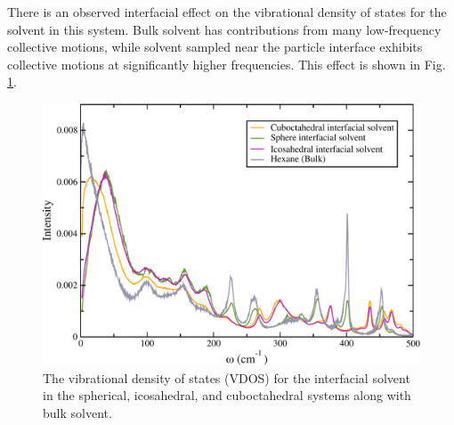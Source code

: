 \documentclass[journal = jpccck, manuscript = suppinfo]{achemso}
\begin{document}
There is an observed interfacial effect on the vibrational density of
states for the solvent in this system.  Bulk solvent has contributions
from many low-frequency collective motions, while solvent sampled near
the particle interface exhibits collective motions at significantly
higher frequencies. This effect is shown in
Fig. \ref{fig:hexane-comp}.

\begin{figure}[!htb]
	\includegraphics[width=5in]{figures/hexane-comp.pdf}
	\caption{The vibrational density of states (VDOS) for the
          interfacial solvent in the spherical, icosahedral, and
          cuboctahedral systems along with bulk solvent.}
	\label{fig:hexane-comp}
\end{figure}



\end{document}
